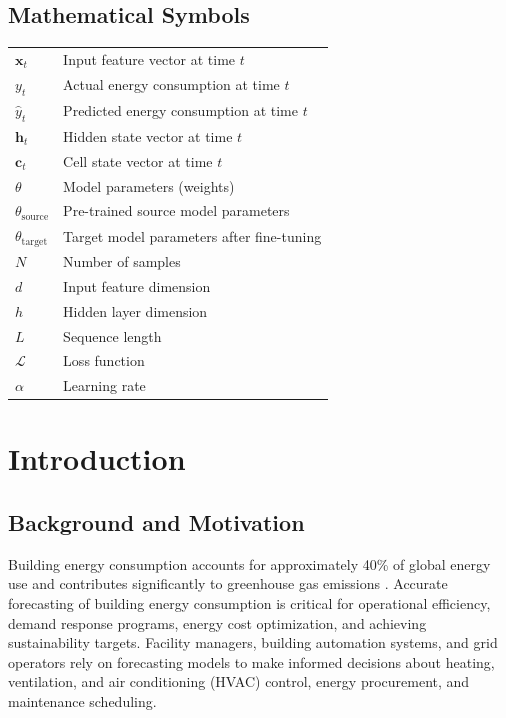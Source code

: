 \documentclass[12pt,a4paper]{report}
\begin{document}
\section*{Mathematical Symbols}
\begin{tabular}{ll}
\(\mathbf{x}_t\) & Input feature vector at time \(t\) \\
\(y_t\) & Actual energy consumption at time \(t\) \\
\(\hat{y}_t\) & Predicted energy consumption at time \(t\) \\
\(\mathbf{h}_t\) & Hidden state vector at time \(t\) \\
\(\mathbf{c}_t\) & Cell state vector at time \(t\) \\
\(\theta\) & Model parameters (weights) \\
\(\theta_{\text{source}}\) & Pre-trained source model parameters \\
\(\theta_{\text{target}}\) & Target model parameters after fine-tuning \\
\(N\) & Number of samples \\
\(d\) & Input feature dimension \\
\(h\) & Hidden layer dimension \\
\(L\) & Sequence length \\
\(\mathcal{L}\) & Loss function \\
\(\alpha\) & Learning rate \\
\end{tabular}

\clearpage

\chapter{Introduction}

\section{Background and Motivation}

Building energy consumption accounts for approximately 40\% of global energy use and contributes significantly to greenhouse gas emissions \cite{iea2021buildings}. Accurate forecasting of building energy consumption is critical for operational efficiency, demand response programs, energy cost optimization, and achieving sustainability targets. Facility managers, building automation systems, and grid operators rely on forecasting models to make informed decisions about heating, ventilation, and air conditioning (HVAC) control, energy procurement, and maintenance scheduling.
\end{document}
